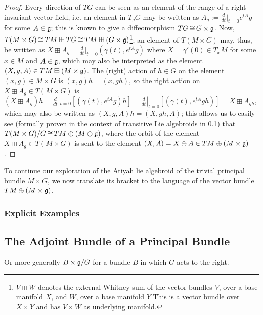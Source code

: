 \begin{proof}
Every direction of $TG$ can be seen as an element of the range of a right-invariant vector field, i.e. an element in $T_g G$ may be written as $A_g :=\frac{d}{dt}|_{t=0}e^{tA}g$ for some $A \in \mathfrak{g}$; this is known to give a diffeomorphism $TG \operatorname{\cong} G \times \mathfrak{g}$. Now, $T(M \times G) \operatorname{\cong} TM \boxplus TG \operatorname{\cong} TM \boxplus (G \times \mathfrak{g})$\footnote{$V \boxplus W$ denotes the external Whitney sum of the vector bundles $V$, over a base manifold $X$, and $W$, over a base manifold $Y$ This is a vector bundle over $X \times Y$ and has $V \times W$ as underlying manifold.}; an element of $T(M \times G)$ may, thus, be written as $X \boxplus A_g = \frac{d}{dt}|_{t = 0}(\gamma(t), e^{tA}g)$ where $X = \gamma'(0) \in T_x M$ for some $x \in M$ and $A \in \mathfrak{g}$, which may also be interpreted as the element $(X, g, A) \in TM \boxplus (M \times \mathfrak{g})$. The (right) action of $h \in G$ on the element $(x, g) \in M\times G$ is $(x, g)h = (x, gh)$, so the right action on $X \boxplus A_g \in T(M \times G)$ is $(X \boxplus A_g)h = \frac{d}{dt}|_{t=0}[(\gamma(t), e^{tA}g)h] = \frac{d}{dt}|_{t=0}[(\gamma(t), e^{tA}gh)] = X \boxplus A_{gh}$, which may also be written as $(X, g, A)h = (X, gh, A)$; this allows us to easily see (formally proven in the context of transitive Lie algebroids in \ref{}) that $T(M \times G)/G \operatorname{\cong} TM \oplus (M \oplus \mathfrak{g})$, where the orbit of the element $X \boxplus A_g \in T(M \times G)$ is sent to the element $(X, A) = X \oplus A \in TM \oplus (M \times \mathfrak{g})$.
\end{proof}

To continue our exploration of the Atiyah lie algebroid of the trivial principal bundle $M \times G$, we now translate its bracket to the language of the vector bundle $TM \oplus (M \times \mathfrak{g})$. 

\subsubsection{Explicit Examples}



\subsection{The Adjoint Bundle of a Principal Bundle}

Or more generally $B \times \mathfrak{g} / G$ for a bundle $B$ in which $G$ acts to the right.

